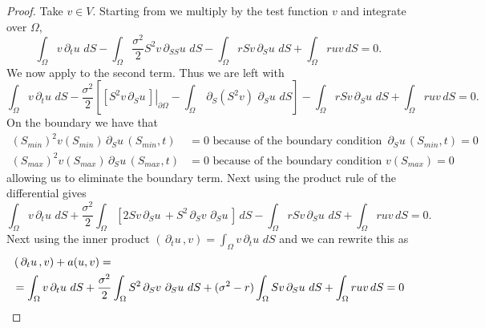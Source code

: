 \documentclass{article}
\newcommand{\argwrapsquare}[1]{\left[#1\right]}
\newcommand{\intS}[1]{\ensuremath{\int_{\Omega}#1 \, dS}}
\newcommand{\intSlong}[1]{\intS{\argwrapsquare{#1}}}
\newcommand{\darg}[2]{\ensuremath{\, \partial_{#2}#1} \, }
\newcommand{\dt}[1]{\ensuremath{\darg{#1}{t}}}
\newcommand{\dS}[1]{\ensuremath{\darg{#1}{S}}}
\newcommand{\dSS}[1]{\ensuremath{\darg{#1}{SS}}}
\newcommand{\dtu}{\dt{u}}
\newcommand{\dSu}{\dS{u}}
\newcommand{\dSSu}{\dSS{u}}
\newcommand{\dSv}{\dS{v}}
\newcommand{\sigmafrac}{\ensuremath{\frac{\sigma^2}{2}}}
\newcommand{\aform}[2]{\ensuremath{\sigmafrac \intS{S^2 \dS{#2} \dS{#1}} + (\sigma^2 - r) \intS{S #2 \dS{#1}} + \intS{r  #1  #2}}}
\newcommand{\auv}{\aform{u}{v}}
\begin{document}
\begin{proof}
    Take $v \in V$. Starting from  we multiply by the test function $v$ and integrate over $\Omega$,
    \begin{equation*}
        \intS{v \dtu} - \intS{\sigmafrac S^2  v  \dSSu } - \intS{r S v \dSu} + \intS{r  u  v} = 0.
    \end{equation*}
    We now apply  to the second term. Thus we are left with
    \begin{equation*}
        \intS{v \dtu} - \sigmafrac \left[ \left. \left[S^2 v \dSu \right] \right|_{\partial\Omega} - \intS{\dS{(S^2v)} \dSu}\right] - \intS{r S v \dSu} + \intS{r  u  v} = 0.
    \end{equation*}
    On the boundary we have that
    \begin{align*}
        (S_{min})^2 v(S_{min}) \dSu(S_{min}, t) &= 0 \text{ because of the boundary condition } \dSu(S_{min}, t) = 0\\
        (S_{max})^2 v(S_{max}) \dSu(S_{max}, t) &= 0 \text{ because of the boundary condition } v(S_{max}) = 0
    \end{align*}
    allowing us to eliminate the boundary term. Next using the product rule of the differential gives 
    \begin{equation*}
        \intS{v \dtu} + \sigmafrac \intSlong{2Sv \dSu + S^2 \dSv \dSu} - \intS{r S v \dSu} + \intS{r  u  v} = 0.
    \end{equation*}
    Next using the inner product $\left( \dtu, v\right) = \intS{v \dtu}$ and  we can rewrite this as
    \begin{align*}
    &\left( \dtu, v\right) + a(u,v) = \\
    &= \intS{v \dtu} + \auv = 0 \qedhere
    \end{align*}
    \end{proof}
\end{document}
